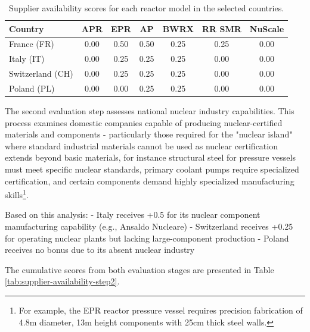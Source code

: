 \begin{table}[!ht]
    \centering
    \begin{tabularx}{\textwidth}{l c c c c c c}
        \toprule
        \textbf{Country} & \textbf{APR} & \textbf{EPR} & \textbf{AP} & \textbf{BWRX} & \textbf{RR SMR} & \textbf{NuScale} \\
        \midrule
        France (FR)       & 0.00 & 0.50 & 0.50 & 0.25 & 0.25 & 0.00 \\
        Italy (IT)       & 0.00 & 0.25 & 0.25 & 0.25 & 0.00 & 0.00 \\
        Switzerland (CH)  & 0.00 & 0.25 & 0.25 & 0.25 & 0.00 & 0.00 \\
        Poland (PL)       & 0.00 & 0.00 & 0.25 & 0.25 & 0.00 & 0.00 \\
        \bottomrule
    \end{tabularx}
    \caption{Supplier availability scores for each reactor model in the selected countries.}
    \label{tab:supplier-availability-step1}
\end{table}

The second evaluation step assesses national nuclear industry capabilities. This process examines domestic companies capable of producing nuclear-certified materials and components - particularly those required for the "nuclear island" where standard industrial materials cannot be used as nuclear certification extends beyond basic materials, for instance structural steel for pressure vessels must meet specific nuclear standards, primary coolant pumps require specialized certification, and certain components demand highly specialized manufacturing skills\footnote{For example, the EPR reactor pressure vessel requires precision fabrication of 4.8m diameter, 13m height components with 25cm thick steel walls.}.

Based on this analysis:
- Italy receives +0.5 for its nuclear component manufacturing capability (e.g., Ansaldo Nucleare)
- Switzerland receives +0.25 for operating nuclear plants but lacking large-component production
- Poland receives no bonus due to its absent nuclear industry

The cumulative scores from both evaluation stages are presented in Table \ref{tab:supplier-availability-step2}.

